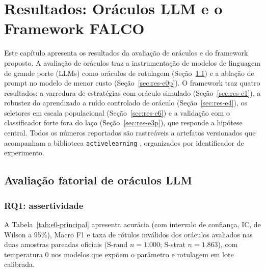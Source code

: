 \chapter{Resultados: Oráculos LLM e o Framework FALCO}
\label{ch:resultados-falco}

Este capítulo apresenta os resultados da avaliação de oráculos e do framework
proposto. A avaliação de oráculos traz a instrumentação de modelos de
linguagem de grande porte (LLMs) como oráculos de rotulagem
(Seção~\ref{sec:res-e0}) e a ablação de prompt no modelo de menor custo
(Seção~\ref{sec:res-e0p}). O framework traz quatro resultados: a varredura de estratégias com oráculo
simulado (Seção~\ref{sec:res-e1}), a robustez do aprendizado a ruído controlado
de oráculo (Seção~\ref{sec:res-e4}), os seletores em escala populacional
(Seção~\ref{sec:res-e6}) e a validação com o classificador forte fora do laço
(Seção~\ref{sec:res-e3p}), que responde a hipótese central. Todos os números
reportados são rastreáveis a artefatos versionados que acompanham a biblioteca
\texttt{activelearning} \cite{DaruActiveLearning}, organizados por identificador
de experimento.

\section{Avaliação fatorial de oráculos LLM}
\label{sec:res-e0}

\subsection{RQ1: assertividade}
\label{sec:res-e0-rq1}

A Tabela~\ref{tab:e0-principal} apresenta acurácia (com intervalo de
confiança, IC, de Wilson a 95\%),
Macro F1 e taxa de rótulos inválidos dos oráculos avaliados nas duas amostras
pareadas oficiais (S-rand $n=1.000$; S-strat $n=1.863$), com temperatura 0
nos modelos que expõem o parâmetro e rotulagem em lote calibrada.

